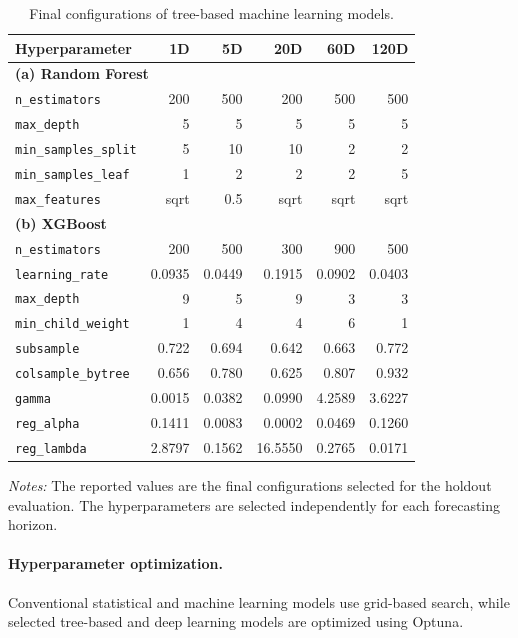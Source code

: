 \documentclass[runningheads,orivec]{llncs}
\begin{document}
\begin{table}[htbp]
\centering
\caption{Final configurations of tree-based machine learning models.}\label{tab:config_trees}
\setlength{\tabcolsep}{5pt}
\begin{tabular}{lrrrrr}
\hline
Hyperparameter & 1D & 5D & 20D & 60D & 120D \\
\hline
\multicolumn{6}{l}{\textbf{(a) Random Forest}} \\
\texttt{n\_estimators}      & 200    & 500    & 200    & 500    & 500 \\
\texttt{max\_depth}         & 5      & 5      & 5      & 5      & 5 \\
\texttt{min\_samples\_split}& 5      & 10     & 10     & 2      & 2 \\
\texttt{min\_samples\_leaf} & 1      & 2      & 2      & 2      & 5 \\
\texttt{max\_features}      & sqrt   & 0.5    & sqrt   & sqrt   & sqrt \\
\hline
\multicolumn{6}{l}{\textbf{(b) XGBoost}} \\
\texttt{n\_estimators}      & 200    & 500    & 300    & 900    & 500 \\
\texttt{learning\_rate}     & 0.0935 & 0.0449 & 0.1915 & 0.0902 & 0.0403 \\
\texttt{max\_depth}         & 9      & 5      & 9      & 3      & 3 \\
\texttt{min\_child\_weight} & 1      & 4      & 4      & 6      & 1 \\
\texttt{subsample}          & 0.722  & 0.694  & 0.642  & 0.663  & 0.772 \\
\texttt{colsample\_bytree}  & 0.656  & 0.780  & 0.625  & 0.807  & 0.932 \\
\texttt{gamma}              & 0.0015 & 0.0382 & 0.0990 & 4.2589 & 3.6227 \\
\texttt{reg\_alpha}         & 0.1411 & 0.0083 & 0.0002 & 0.0469 & 0.1260 \\
\texttt{reg\_lambda}        & 2.8797 & 0.1562 & 16.5550 & 0.2765 & 0.0171 \\
\hline
\end{tabular}
\par\vspace{4pt}\parbox{\linewidth}{\scriptsize\textit{Notes:} The reported values are the final configurations selected for the holdout evaluation. The hyperparameters are selected independently for each forecasting horizon.}
\end{table}

\paragraph{Hyperparameter optimization.} Conventional statistical and machine learning models use grid-based search, while selected tree-based and deep learning models are optimized using Optuna.
\end{document}
